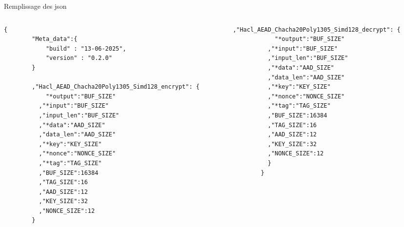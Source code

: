 \documentclass[A4,svgnames,9pt,aspectratio=169]{beamer}
\begin{document}

\begin{frame}[fragile]{Remplissage des json}
  \begin{columns}
    \begin{column}{0.5\textwidth}
      \begin{lstlisting}[style=CStyle, gobble=8, caption={Hacl\_AEAD\_Chacha20Poly1305\_Simd128.json (1)}]
        {
        "Meta_data":{
            "build" : "13-06-2025",
            "version" : "0.2.0"
        }
    
        ,"Hacl_AEAD_Chacha20Poly1305_Simd128_encrypt": {
            "*output":"BUF_SIZE"
          ,"*input":"BUF_SIZE"
          ,"input_len":"BUF_SIZE"
          ,"*data":"AAD_SIZE"
          ,"data_len":"AAD_SIZE"
          ,"*key":"KEY_SIZE"
          ,"*nonce":"NONCE_SIZE"
          ,"*tag":"TAG_SIZE"
          ,"BUF_SIZE":16384
          ,"TAG_SIZE":16
          ,"AAD_SIZE":12
          ,"KEY_SIZE":32
          ,"NONCE_SIZE":12
        }
      \end{lstlisting}
    \end{column}

    \begin{column}{0.5\textwidth}
      \begin{lstlisting}[style=CStyle, gobble=8, caption={Hacl\_AEAD\_Chacha20Poly1305\_Simd128.json (2)}]
        ,"Hacl_AEAD_Chacha20Poly1305_Simd128_decrypt": {
            "*output":"BUF_SIZE"
          ,"*input":"BUF_SIZE"
          ,"input_len":"BUF_SIZE"
          ,"*data":"AAD_SIZE"
          ,"data_len":"AAD_SIZE"
          ,"*key":"KEY_SIZE"
          ,"*nonce":"NONCE_SIZE"
          ,"*tag":"TAG_SIZE"
          ,"BUF_SIZE":16384
          ,"TAG_SIZE":16
          ,"AAD_SIZE":12
          ,"KEY_SIZE":32
          ,"NONCE_SIZE":12
          }
        }
      \end{lstlisting}
    \end{column}
  \end{columns}
\end{frame}

\end{document}
